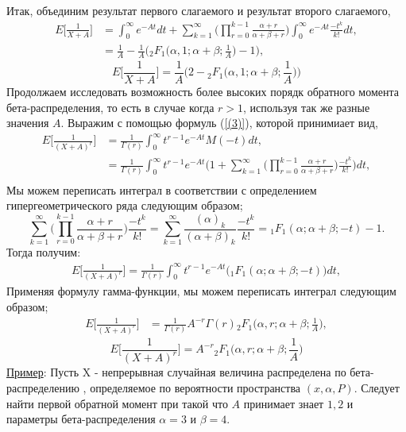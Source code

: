 \documentclass[13pt]{article}
\begin{document}
Итак, объединим результат первого слагаемого и результат второго слагаемого,
\begin{align*}
 E\bigg[\frac{1}{X+A}\bigg] &= \int_{0}^{\infty} e^{-At} dt + \sum_{k=1}^{\infty}\Bigg( \prod_{r=0}^{k-1} \frac{\alpha + r}{\alpha + \beta + r}\Bigg)\int_{0}^{\infty} e^{-At}\frac{-t^{k}}{k!} dt,  \\
 &= \frac{1}{A} - \frac{1}{A}\bigg({_{2}F_{1}}\big(\alpha, 1; \alpha + \beta; \frac{1}{A}\big) - 1 \bigg),
\end{align*}
\begin{equation}\label{eq:33}
    E\bigg[\frac{1}{X+A}\bigg] = \frac{1}{A}\bigg(2 - {_{2}F_{1}}\Big(\alpha, 1; \alpha + \beta; \frac{1}{A}\Big) \bigg)
\end{equation}
Продолжаем исследовать возможность более высоких порядк обратного момента бета-распределения, то есть в случае когда $r >1$, используя так же разные значения $A$. Выражим с помощью формуль (\ref{(3)}), которой  принимиает вид,
\begin{align*}
    E\Big[\frac{1}{(X+A)^{r}}\Big] &= \frac{1}{\Gamma(r)}\int_{0}^{\infty}t^{r-1}e^{-At}M(-t)dt ,\\
    &= \frac{1}{\Gamma(r)}\int_{0}^{\infty}t^{r-1}e^{-At}\Bigg(1 + \sum_{k=1}^{\infty}\Bigg( \prod_{r=0}^{k-1} \frac{\alpha + r}{\alpha + \beta + r}\Bigg)\frac{-t^{k}}{k!}\Bigg) dt, \\
\end{align*}
Мы можем переписать интеграл в соответствии с определением гипергеометрического ряда следующим образом;
\[
\sum_{k=1}^{\infty}\Bigg( \prod_{r=0}^{k-1} \frac{\alpha + r}{\alpha + \beta + r}\Bigg) \frac{-t^{k}}{k!} = \sum_{k=1}^{\infty} \frac{(\alpha)_{k}}{(\alpha + \beta)_{k}} \frac{-t^{k}}{k!} = {_{1}F_{1}}(\alpha; \alpha + \beta;-t ) -1.
\]
Тогда получим:
\begin{align*}
    E\Big[\frac{1}{(X+A)^{r}}\Big] = \frac{1}{\Gamma(r)}\int_{0}^{\infty}t^{r-1}e^{-At}\Big( {_{1}F_{1}}(\alpha; \alpha + \beta;-t) \Big)dt,
\end{align*}
Применяя формулу гамма-функции, мы можем переписать интеграл следующим образом;
\begin{align*}
    E\Big[\frac{1}{(X+A)^{r}}\Big] &= \frac{1}{\Gamma(r)} A^{-r}\Gamma(r){_{2}F_{1}}\Big(\alpha, r; \alpha + \beta;\frac{1}{A}\Big),
\end{align*}
\begin{equation} \label{eq:34}
    E\Big[\frac{1}{(X+A)^{r}}\Big]   = A^{-r} {_{2}F_{1}}\Big(\alpha, r; \alpha + \beta;\frac{1}{A}\Big)
\end{equation}
\underline{Пример}:
Пусть X - непрерывная случайная величина распределена по бета-распределению , определяемое по вероятности пространства $(x, \alpha, P)$. Следует найти первой обратной  момент при такой что $A$ принимает знает $1, 2$ и параметры бета-распределения $\alpha = 3$ и $\beta = 4$. 
\end{document}
